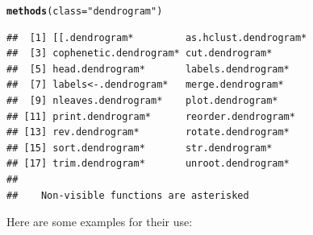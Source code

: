 \documentclass[shortnames,nojss,article]{jss}\usepackage{graphicx, color}
\makeatletter
\newcommand{\hlfunctioncall}[1]{\textcolor[rgb]{0.501960784313725,0,0.329411764705882}{\textbf{#1}}}%
\newcommand{\hlstring}[1]{\textcolor[rgb]{0.6,0.6,1}{#1}}%
\newenvironment{kframe}{%
 \def\at@end@of@kframe{}%
 \ifinner\ifhmode%
  \def\at@end@of@kframe{\end{minipage}}%
  \begin{minipage}{\columnwidth}%
 \fi\fi%
 \def\FrameCommand##1{\hskip\@totalleftmargin \hskip-\fboxsep
 \colorbox{shadecolor}{##1}\hskip-\fboxsep
     \hskip-\linewidth \hskip-\@totalleftmargin \hskip\columnwidth}%
 \MakeFramed {\advance\hsize-\width
   \@totalleftmargin\z@ \linewidth\hsize
   \@setminipage}}%
 {\par\unskip\endMakeFramed%
 \at@end@of@kframe}
\newenvironment{knitrout}{}{} %
\makeatother
\begin{document}
\begin{knitrout}
\color{fgcolor}\begin{kframe}
\begin{alltt}
\hlfunctioncall{methods}(class = \hlstring{"dendrogram"})
\end{alltt}
\begin{verbatim}
##  [1] [[.dendrogram*         as.hclust.dendrogram* 
##  [3] cophenetic.dendrogram* cut.dendrogram*       
##  [5] head.dendrogram*       labels.dendrogram*    
##  [7] labels<-.dendrogram*   merge.dendrogram*     
##  [9] nleaves.dendrogram*    plot.dendrogram*      
## [11] print.dendrogram*      reorder.dendrogram*   
## [13] rev.dendrogram*        rotate.dendrogram*    
## [15] sort.dendrogram*       str.dendrogram*       
## [17] trim.dendrogram*       unroot.dendrogram*    
## 
##    Non-visible functions are asterisked
\end{verbatim}
\end{kframe}
\end{knitrout}



Here are some examples for their use:
\end{document}
